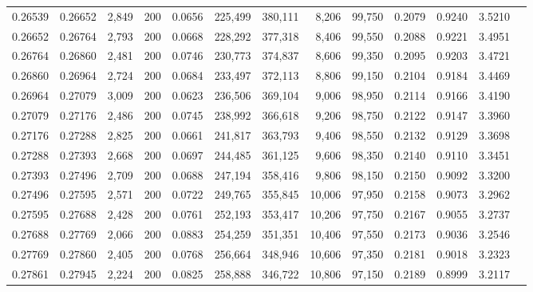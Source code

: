 \begin{tabular}{rrrrrrrrrrrrr}
0.26539 & 0.26652 &  2,849 & 200 &                                     0.0656 & 225,499 & 380,111 &   8,206 &  99,750 & 0.2079 & 0.9240 & 3.5210 \\
0.26652 & 0.26764 &  2,793 & 200 &                                     0.0668 & 228,292 & 377,318 &   8,406 &  99,550 & 0.2088 & 0.9221 & 3.4951 \\
0.26764 & 0.26860 &  2,481 & 200 &                                     0.0746 & 230,773 & 374,837 &   8,606 &  99,350 & 0.2095 & 0.9203 & 3.4721 \\
0.26860 & 0.26964 &  2,724 & 200 &                                     0.0684 & 233,497 & 372,113 &   8,806 &  99,150 & 0.2104 & 0.9184 & 3.4469 \\
0.26964 & 0.27079 &  3,009 & 200 &                                     0.0623 & 236,506 & 369,104 &   9,006 &  98,950 & 0.2114 & 0.9166 & 3.4190 \\
0.27079 & 0.27176 &  2,486 & 200 &                                     0.0745 & 238,992 & 366,618 &   9,206 &  98,750 & 0.2122 & 0.9147 & 3.3960 \\
0.27176 & 0.27288 &  2,825 & 200 &                                     0.0661 & 241,817 & 363,793 &   9,406 &  98,550 & 0.2132 & 0.9129 & 3.3698 \\
0.27288 & 0.27393 &  2,668 & 200 &                                     0.0697 & 244,485 & 361,125 &   9,606 &  98,350 & 0.2140 & 0.9110 & 3.3451 \\
0.27393 & 0.27496 &  2,709 & 200 &                                     0.0688 & 247,194 & 358,416 &   9,806 &  98,150 & 0.2150 & 0.9092 & 3.3200 \\
0.27496 & 0.27595 &  2,571 & 200 &                                     0.0722 & 249,765 & 355,845 &  10,006 &  97,950 & 0.2158 & 0.9073 & 3.2962 \\
0.27595 & 0.27688 &  2,428 & 200 &                                     0.0761 & 252,193 & 353,417 &  10,206 &  97,750 & 0.2167 & 0.9055 & 3.2737 \\
0.27688 & 0.27769 &  2,066 & 200 &                                     0.0883 & 254,259 & 351,351 &  10,406 &  97,550 & 0.2173 & 0.9036 & 3.2546 \\
0.27769 & 0.27860 &  2,405 & 200 &                                     0.0768 & 256,664 & 348,946 &  10,606 &  97,350 & 0.2181 & 0.9018 & 3.2323 \\
0.27861 & 0.27945 &  2,224 & 200 &                                     0.0825 & 258,888 & 346,722 &  10,806 &  97,150 & 0.2189 & 0.8999 & 3.2117 \\

\end{tabular}
